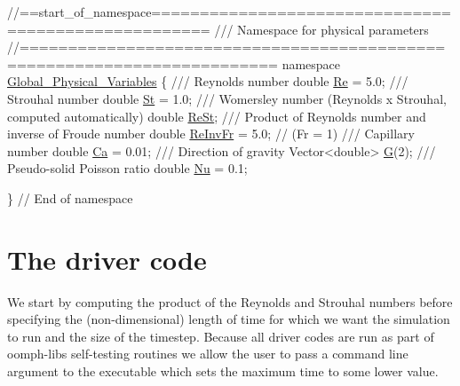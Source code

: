  
\begin{DoxyCodeInclude}
\textcolor{comment}{//==start\_of\_namespace====================================================}
\textcolor{comment}{/// Namespace for physical parameters}
\textcolor{comment}{}\textcolor{comment}{//========================================================================}
\textcolor{keyword}{namespace }\hyperlink{namespaceGlobal__Physical__Variables}{Global\_Physical\_Variables}
\{
\textcolor{comment}{}
\textcolor{comment}{ /// Reynolds number}
\textcolor{comment}{} \textcolor{keywordtype}{double} \hyperlink{namespaceGlobal__Physical__Variables_ab814e627d2eb5bc50318879d19ab16b9}{Re} = 5.0;
\textcolor{comment}{}
\textcolor{comment}{ /// Strouhal number}
\textcolor{comment}{} \textcolor{keywordtype}{double} \hyperlink{namespaceGlobal__Physical__Variables_a4b6ef72bd221361c37f5b9a4a6899afc}{St} = 1.0;
\textcolor{comment}{}
\textcolor{comment}{ /// Womersley number (Reynolds x Strouhal, computed automatically)}
\textcolor{comment}{} \textcolor{keywordtype}{double} \hyperlink{namespaceGlobal__Physical__Variables_a085ee4bf968ffdd01a41b8c41864f907}{ReSt};
 \textcolor{comment}{}
\textcolor{comment}{ /// Product of Reynolds number and inverse of Froude number}
\textcolor{comment}{} \textcolor{keywordtype}{double} \hyperlink{namespaceGlobal__Physical__Variables_aa6286f02b476912dd7550eced538331a}{ReInvFr} = 5.0; \textcolor{comment}{// (Fr = 1)}
\textcolor{comment}{}
\textcolor{comment}{ /// Capillary number}
\textcolor{comment}{} \textcolor{keywordtype}{double} \hyperlink{namespaceGlobal__Physical__Variables_a8b32b93d2e546f9375ec418474107838}{Ca} = 0.01;
\textcolor{comment}{}
\textcolor{comment}{ /// Direction of gravity}
\textcolor{comment}{} Vector<double> \hyperlink{namespaceGlobal__Physical__Variables_a37a6f46efcb35b4bd12c73f19d741020}{G}(2);
\textcolor{comment}{}
\textcolor{comment}{ /// Pseudo-solid Poisson ratio}
\textcolor{comment}{} \textcolor{keywordtype}{double} \hyperlink{namespaceGlobal__Physical__Variables_a3962c36313826b19f216f6bbbdd6a477}{Nu} = 0.1;

\} \textcolor{comment}{// End of namespace}

\end{DoxyCodeInclude}




 

\hypertarget{index_main}{}\section{The driver code}\label{index_main}
We start by computing the product of the Reynolds and Strouhal numbers before specifying the (non-\/dimensional) length of time for which we want the simulation to run and the size of the timestep. Because all driver codes are run as part of {\ttfamily oomph-\/lib\textquotesingle{}s} self-\/testing routines we allow the user to pass a command line argument to the executable which sets the maximum time to some lower value.


